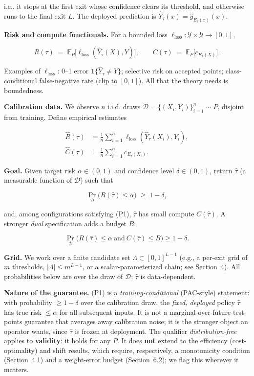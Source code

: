 \documentclass{ieeeaccess}
\begin{document}
i.e., it stops at the first exit whose confidence clears its threshold, and otherwise runs to the final exit $L$. The deployed prediction is $\hat Y_\tau(x)=\hat y_{E_\tau(x)}(x)$.

\textbf{Risk and compute functionals.} For a bounded loss $\ell_{\mathrm{loss}}:\mathcal Y\times\mathcal Y\to[0,1]$,

\[
R(\tau) \;=\; \mathbb E_{P}\!\big[\ell_{\mathrm{loss}}(\hat Y_\tau(X),Y)\big],
\qquad
C(\tau) \;=\; \mathbb E_{P}\!\big[c_{E_\tau(X)}\big].
\]

Examples of $\ell_{\mathrm{loss}}$: 0--1 error $\mathbf 1\{\hat Y_\tau\ne Y\}$; selective risk on accepted points; class-conditional false-negative rate (clip to $[0,1]$). All that the theory needs is boundedness.

\textbf{Calibration data.} We observe $n$ i.i.d. draws $\mathcal D=\{(X_i,Y_i)\}_{i=1}^n\sim P$, disjoint from training. Define empirical estimates

\[
\begin{aligned}
\hat R(\tau)
&=\frac1n\sum_{i=1}^n \ell_{\mathrm{loss}}(\hat Y_\tau(X_i),Y_i),\\
\hat C(\tau)
&=\frac1n\sum_{i=1}^n c_{E_\tau(X_i)}.
\end{aligned}
\]

\textbf{Goal.} Given target risk $\alpha\in(0,1)$ and confidence level $\delta\in(0,1)$, return $\hat\tau$ (a measurable function of $\mathcal D$) such that

\begin{equation}
\Pr_{\mathcal D}\big(R(\hat\tau)\le\alpha\big)\;\ge\;1-\delta,
\tag{P1}
\end{equation}

and, among configurations satisfying (P1), $\hat\tau$ has small compute $C(\hat\tau)$. A stronger \emph{dual} specification adds a budget $B$:

\begin{equation}
\Pr_{\mathcal D}\big(R(\hat\tau)\le\alpha \ \text{and}\ C(\hat\tau)\le B\big)\ge 1-\delta.
\tag{P2}
\end{equation}

\textbf{Grid.} We work over a finite candidate set $\Lambda\subset[0,1]^{L-1}$ (e.g., a per-exit grid of $m$ thresholds, $|\Lambda|\le m^{L-1}$, or a scalar-parameterized chain; see Section~4). All probabilities below are over the draw of $\mathcal D$; $\hat\tau$ is data-dependent.

\textbf{Nature of the guarantee.} (P1) is a \emph{training-conditional} (PAC-style) statement: with probability $\ge1-\delta$ over the calibration draw, the \emph{fixed, deployed} policy $\hat\tau$ has true risk $\le\alpha$ for all subsequent inputs. It is not a marginal-over-future-test-points guarantee that averages away calibration noise; it is the stronger object an operator wants, since $\hat\tau$ is frozen at deployment. The qualifier \emph{distribution-free} applies to \textbf{validity}: it holds for any $P$. It does \textbf{not} extend to the efficiency (cost-optimality) and shift results, which require, respectively, a monotonicity condition (Section~4.1) and a weight-error budget (Section~6.2); we flag this wherever it matters.
\end{document}
